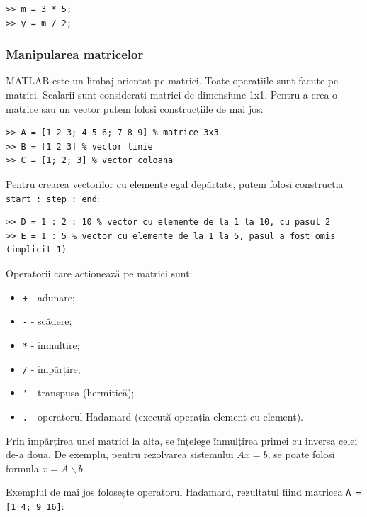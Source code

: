 \documentclass{exam}
\begin{document}
\begin{lstlisting}
>> m = 3 * 5;
>> y = m / 2;
\end{lstlisting}

\subsubsection{Manipularea matricelor}

\par MATLAB este un limbaj orientat pe matrici. Toate operațiile sunt făcute pe
matrici. Scalarii sunt considerați matrici de dimensiune 1x1. Pentru a crea o
matrice sau un vector putem folosi construcțiile de mai jos:

\begin{lstlisting}
>> A = [1 2 3; 4 5 6; 7 8 9] % matrice 3x3
>> B = [1 2 3] % vector linie
>> C = [1; 2; 3] % vector coloana
\end{lstlisting}

\par Pentru crearea vectorilor cu elemente egal depărtate, putem folosi
construcția \verb|start : step : end|:

\begin{lstlisting}
>> D = 1 : 2 : 10 % vector cu elemente de la 1 la 10, cu pasul 2
>> E = 1 : 5 % vector cu elemente de la 1 la 5, pasul a fost omis (implicit 1)
\end{lstlisting}

\par Operatorii care acționează pe matrici sunt:

\begin{itemize}
	\item \verb|+| - adunare;
	\item \verb|-| - scădere;
	\item \verb|*| - înmulțire;
	\item \verb|/| - împărțire;
	\item \verb|'| - transpusa (hermitică);
	\item \verb|.| - operatorul Hadamard (execută operația element cu element).
\end{itemize}

\par Prin împărțirea unei matrici la alta, se înțelege înmulțirea primei cu
inversa celei de-a doua. De exemplu, pentru rezolvarea sistemului $Ax = b$, se
poate folosi formula $x = A \backslash b$.

\par Exemplul de mai jos folosește operatorul Hadamard, rezultatul fiind
matricea \verb|A = [1 4; 9 16]|:
\end{document}
